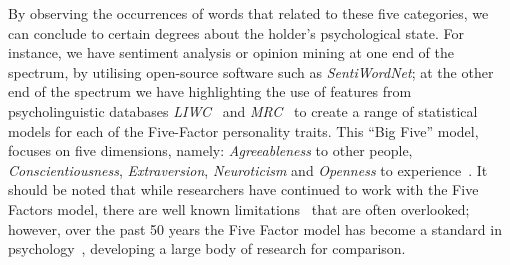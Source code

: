 \documentclass[graybox]{svmult}
\begin{document}
By observing the occurrences of words that related to these five
categories, we can conclude to certain degrees about the holder's
psychological state. For instance, we have sentiment analysis or
opinion mining at one end of the spectrum, by utilising open-source
software such as {\emph{SentiWordNet}}; at the other end of the
spectrum we have \citet{mairesse-et-al:2007} highlighting the use of
features from psycholinguistic databases
{\emph{LIWC}}~\citep{pennebaker-et-al:2001} and
{\emph{MRC}}~\citep{wilson:1988} to create a range of statistical
models for each of the Five-Factor personality traits. This ``Big
Five'' model, focuses on five dimensions, namely:
{\emph{Agreeableness}} to other people, {\emph{Conscientiousness}},
{\emph{Extraversion}}, {\emph{Neuroticism}} and {\emph{Openness}} to
experience~\citep{norman:1963,peabody+goldberg:1989}. It should be
noted that while researchers have continued to work with the Five
Factors model, there are well known
limitations~\cite{eysenck:1992,paunonen+jackson:2000,block:2010} that
are often overlooked; however, over the past 50 years the Five Factor
model has become a standard in psychology~\cite{mairesse-et-al:2007},
developing a large body of research for comparison.


\end{document}
